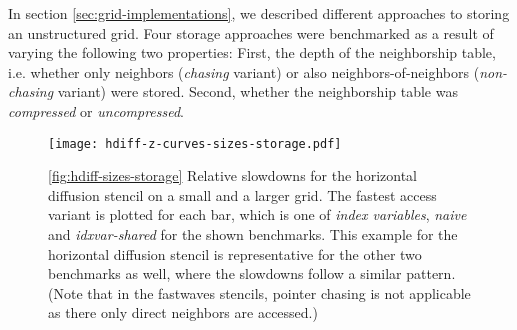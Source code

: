 In section \ref{sec:grid-implementations}, we described different approaches to storing an unstructured grid. Four storage approaches were benchmarked as a result of varying the following two properties: First, the depth of the neighborship table, i.e. whether only neighbors (\emph{chasing} variant) or also neighbors-of-neighbors (\emph{non-chasing} variant) were stored. Second, whether the neighborship table was \emph{compressed} or \emph{uncompressed}.

\begin{figure}
	\texttt{[image: hdiff-z-curves-sizes-storage.pdf]}
	\caption{\ref{fig:hdiff-sizes-storage} Relative slowdowns for the horizontal diffusion stencil on a small and a larger grid. The fastest access variant is plotted for each bar, which is one of \emph{index variables}, \emph{naive} and \emph{idxvar-shared} for the shown benchmarks. This example for the horizontal diffusion stencil is representative for the other two benchmarks as well, where the slowdowns follow a similar pattern. (Note that in the fastwaves stencils, pointer chasing is not applicable as there only direct neighbors are accessed.)}
\end{figure}

